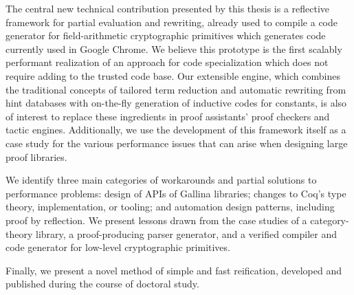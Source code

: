 The central new technical contribution presented by this thesis is a reflective framework for partial evaluation and rewriting, already used to compile a code generator for field-arithmetic cryptographic primitives which generates code currently used in Google Chrome.
We believe this prototype is the first scalably performant realization of an approach for code specialization which does not require adding to the trusted code base.
Our extensible engine, which combines the traditional concepts of tailored term reduction and automatic rewriting from hint databases with on-the-fly generation of inductive codes for constants, is also of interest to replace these ingredients in proof assistants' proof checkers and tactic engines.
Additionally, we use the development of this framework itself as a case study for the various performance issues that can arise when designing large proof libraries.

We identify three main categories of workarounds and partial solutions to performance problems: design of APIs of Gallina libraries; changes to Coq's type theory, implementation, or tooling; and automation design patterns, including proof by reflection.
We present lessons drawn from the case studies of a category-theory library, a proof-producing parser generator, and a verified compiler and code generator for low-level cryptographic primitives.

Finally, we present a novel method of simple and fast reification, developed and published during the course of doctoral study.

